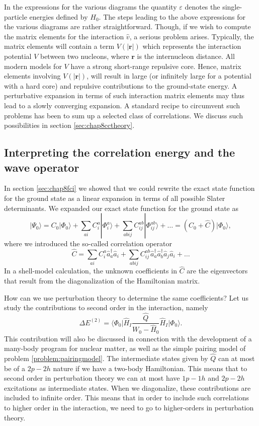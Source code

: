   In the expressions for the various diagrams the quantity $\varepsilon$ denotes the single-particle energies
  defined by $H_0$.  The steps leading to the above expressions for
  the various diagrams are rather straightforward. Though, if we wish
  to compute the matrix elements for the interaction $\hat{v}$, a serious
  problem arises. Typically, the matrix elements will contain a term
  $V(|{\mathbf r}|)$
  which represents the interaction potential $V$ between two nucleons,
  where ${\mathbf r}$ is the internucleon distance.  All modern models
  for $V$ have a strong short-range repulsive core. Hence, matrix
  elements involving $V(|{\mathbf r}|)$, will result in large (or
  infinitely large for a potential with a hard core) and repulsive
  contributions to the ground-state energy. 
  A perturbative expansion in terms of
such interaction matrix elements may thus lead to a slowly converging expansion.
A standard recipe to circumvent such problems has been to sum up 
a selected class of correlations. We discuss such possibilities in section \ref{sec:chap8cctheory}.  



  \subsection{Interpreting the correlation energy and the wave operator}

  In section \ref{sec:chap8fci} we showed that we could rewrite the exact state
  function for the ground state as a linear expansion in terms of all
  possible Slater determinants.  We expanded  our
  exact state function for the ground state as
  \[
  |\Psi_0\rangle=C_0|\Phi_0\rangle+\sum_{ai}C_i^a|\Phi_i^a\rangle+\sum_{abij}C_{ij}^{ab}|\Phi_{ij}^{ab}\rangle+\dots
  =(C_0+\hat{C})|\Phi_0\rangle,
  \]
  where we introduced the so-called correlation operator
  \[
  \hat{C}=\sum_{ai}C_i^a\hat{a}_{a}^{\dagger}\hat{a}_i
  +\sum_{abij}C_{ij}^{ab}\hat{a}_{a}^{\dagger}\hat{a}_{b}^{\dagger}\hat{a}_j\hat{a}_i+\dots
  \]
  In a shell-model calculation, the unknown coefficients in $\hat{C}$
  are the eigenvectors that result from the diagonalization of the
  Hamiltonian matrix.

  How can we use perturbation theory to determine the same
  coefficients? Let us study the contributions to second order in the
  interaction, namely
  \[
  \Delta E^{(2)}=\langle\Phi_0\vert
  \hat{H}_I\frac{\hat{Q}}{W_0-\hat{H}_0}\hat{H}_I\vert \Phi_0\rangle.
  \]
  This contribution will also be discussed in connection with the
  development of a many-body program for nuclear matter, as well as
  the simple pairing model of problem \ref{problem:pairingmodel}.  The
  intermediate states given by $\hat{Q}$ can at most be of a $2p-2h$
  nature if we have a two-body Hamiltonian. This means that to second
  order in perturbation theory we can at most have $1p-1h$ and $2p-2h$
  excitations as intermediate states. When we diagonalize, these
  contributions are included to infinite order. This means that in
  order to include such correlations to higher order in the
  interaction, we need to go to higher-orders in perturbation theory.

